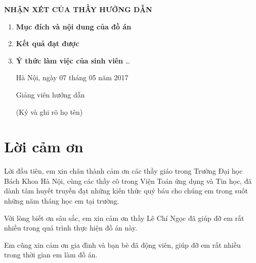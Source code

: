 \documentclass[14pt, oneside, a4paper, openany]{scrartcl}
\begin{document}
\newpage
\thispagestyle{empty}
\centerline{\Large\bf NHẬN XÉT CỦA THẦY HƯỚNG DẪN}
\begin{enumerate}
	\item \textbf{Mục đích và nội dung của đồ án}
	\newline
	\newline
	\newline
	\newline
	\item \textbf{Kết quả đạt được}
	\newline
	\newline
	\newline
	\newline
	\item \textbf{Ý thức làm việc của sinh viên} \ldots
	\newline
	\newline
	\newline
	\newline
	\newline
	
	\begin{flushright}
		Hà Nội, ngày 07 tháng 05 năm 2017
	\end{flushright}
	\hspace{95 mm}Giảng viên hướng dẫn
	
	\hspace{95 mm}(Ký và ghi rõ họ tên)
\end{enumerate}

\newpage
\thispagestyle{empty}
\tableofcontents
\newpage
\thispagestyle{empty}
\listoffigures
\listoftables
\listofalgorithms
{}
\newpage
\section{Lời cảm ơn}
Lời đầu tiên, em xin chân thành cảm ơn các thầy giáo trong Trường Đại học Bách Khoa Hà Nội, cùng các thầy cô trong Viện Toán ứng dụng và Tin học, đã dành tâm huyết truyền đạt những kiến thức quý báu cho chúng em trong suốt những năm tháng học em tại trường.

Với lòng biết ơn sâu sắc, em xin cảm ơn thầy Lê Chí Ngọc đã giúp đỡ em rất nhiều trong quá trình thực hiện đồ án này.

Em cũng xin cảm ơn gia đình và bạn bè đã động viên, giúp đỡ em rất nhiều trong thời gian em làm đồ án.
\end{document}
